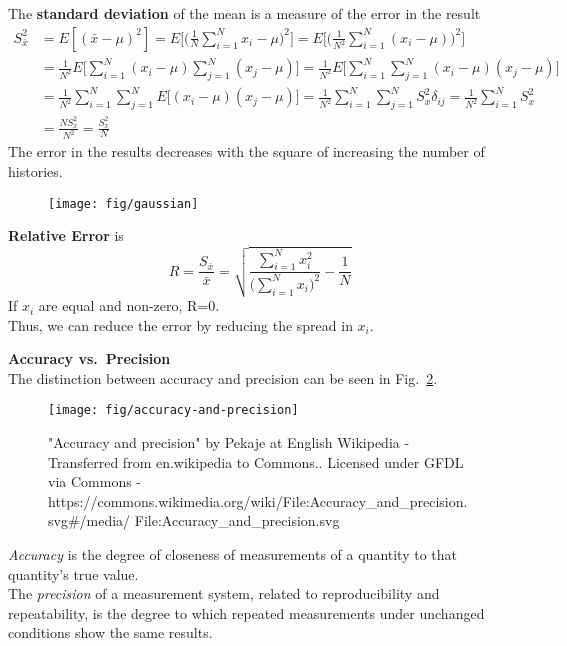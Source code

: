 \documentclass[12pt]{article}
\begin{document}
The \textbf{standard deviation} of the mean is a measure of the error in the result
\begin{align*}
S_{\bar{x}}^2 &= E[(\bar{x} - \mu)^2] = E\biggl[ \biggl(\frac{1}{N}\sum_{i=1}^N x_i - \mu\biggr)^2\biggr] = E\biggl[ \biggl(\frac{1}{N^2}\sum_{i=1}^N (x_i - \mu)\biggr)^2\biggr]\\
%
&=\frac{1}{N^2} E\biggl[ \sum_{i=1}^N (x_i - \mu) \sum_{j=1}^N (x_j - \mu)\biggr] = \frac{1}{N^2} E\biggl[ \sum_{i=1}^N \sum_{j=1}^N (x_i - \mu)  (x_j - \mu)\biggr]\\
%
&= \frac{1}{N^2} \sum_{i=1}^N \sum_{j=1}^N E\bigl[  (x_i - \mu)  (x_j - \mu)\bigr] = \frac{1}{N^2} \sum_{i=1}^N \sum_{j=1}^N S^2_x \delta_{ij} = \frac{1}{N^2} \sum_{i=1}^N S_x^2 \\
%
&= \frac{N S_x^2}{N^2} = \boxed{\frac{S_x^2}{N}}
\end{align*}
The error in the results decreases with the square of increasing the number of histories.
%
\begin{figure}[h!]
\begin{center}
  \texttt{[image: fig/gaussian]}
\end{center}
  \label{fig:gaussian}
\end{figure}

\textbf{Relative Error} is 
\[
R = \frac{S_{\bar{x}}}{\bar{x}} = \sqrt{\frac{\sum_{i=1}^N x_i^2}{\bigl(\sum_{i=1}^N x_i\bigr)^2} - \frac{1}{N}} 
\]
If $x_i$ are equal and non-zero, R=0.\\
Thus, we can reduce the error by reducing the spread in $x_i$.

\textbf{Accuracy vs.\ Precision}\\
The distinction between accuracy and precision can be seen in Fig.~\ref{fig:accuracy}.\\
%
\begin{figure}[h!]
\begin{center}
  \texttt{[image: fig/accuracy-and-precision]}
\end{center}
  \caption{"Accuracy and precision" by Pekaje at English Wikipedia - Transferred from en.wikipedia to Commons.. Licensed under GFDL via Commons - https://commons.wikimedia.org/wiki/File:Accuracy\_and\_precision.svg\#/media/
  File:Accuracy\_and\_precision.svg}
  \label{fig:accuracy}
\end{figure}
%
\textit{Accuracy} is the degree of closeness of measurements of a quantity to that quantity's true value.\\
The \textit{precision} of a measurement system, related to reproducibility and repeatability, is the degree to which repeated measurements under unchanged conditions show the same results.
\end{document}
